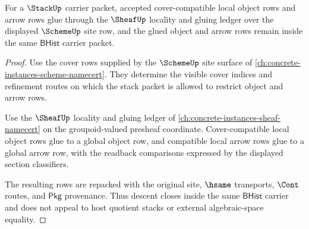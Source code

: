 \begin{theorem}\label{thm:stack-descent-obligation}
For a $\StackUp$ carrier packet, accepted cover-compatible local object rows and arrow rows glue through the $\SheafUp$ locality and gluing ledger over the displayed $\SchemeUp$ site row, and the glued object and arrow rows remain inside the same $\mathsf{BHist}$ carrier packet.
\end{theorem}
\begin{proof}
Use the cover rows supplied by the $\SchemeUp$ site surface of \autoref{ch:concrete-instances-scheme-namecert}. They determine the visible cover indices and refinement routes on which the stack packet is allowed to restrict object and arrow rows.

Use the $\SheafUp$ locality and gluing ledger of \autoref{ch:concrete-instances-sheaf-namecert} on the groupoid-valued presheaf coordinate. Cover-compatible local object rows glue to a global object row, and compatible local arrow rows glue to a global arrow row, with the readback comparisons expressed by the displayed section classifiers.

The resulting rows are repacked with the original site, $\hsame$ transports, $\Cont$ routes, and $\mathsf{Pkg}$ provenance. Thus descent closes inside the same $\mathsf{BHist}$ carrier and does not appeal to host quotient stacks or external algebraic-space equality.
\end{proof}

